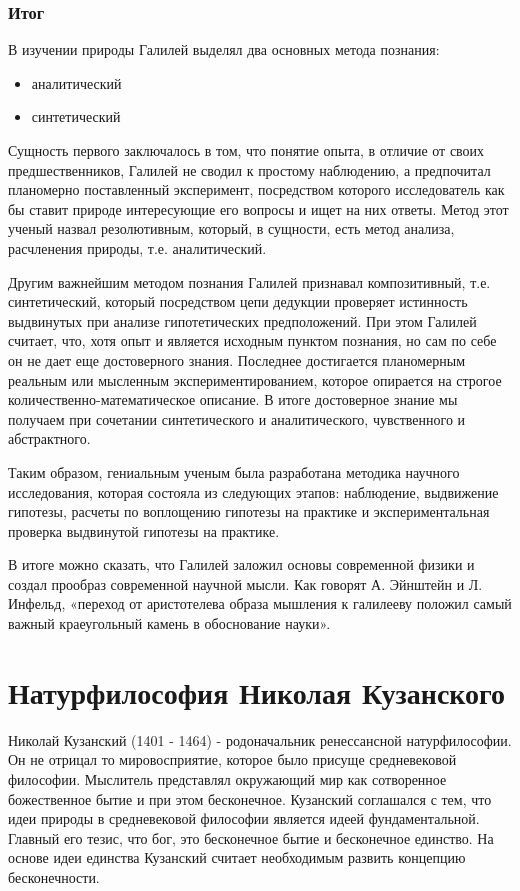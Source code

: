 \documentclass[a4paper, 14pt]{extreport}
\begin{document}
\subsubsection{Итог}

В изучении природы Галилей выделял два основных метода познания:

\begin{itemize}

\item
  аналитический
\item
  синтетический
\end{itemize}

Сущность первого заключалось в том, что понятие опыта, в отличие от
своих предшественников, Галилей не сводил к простому наблюдению, а
предпочитал планомерно поставленный эксперимент, посредством которого
исследователь как бы ставит природе интересующие его вопросы и ищет на
них ответы. Метод этот ученый назвал резолютивным, который, в сущности,
есть метод анализа, расчленения природы, т.е. аналитический.

Другим важнейшим методом познания Галилей признавал композитивный, т.е.
синтетический, который посредством цепи дедукции проверяет истинность
выдвинутых при анализе гипотетических предположений. При этом Галилей
считает, что, хотя опыт и является исходным пунктом познания, но сам по
себе он не дает еще достоверного знания. Последнее достигается
планомерным реальным или мысленным экспериментированием, которое
опирается на строгое количественно-математическое описание. В итоге
достоверное знание мы получаем при сочетании синтетического и
аналитического, чувственного и абстрактного.

Таким образом, гениальным ученым была разработана методика научного
исследования, которая состояла из следующих этапов: наблюдение,
выдвижение гипотезы, расчеты по воплощению гипотезы на практике и
экспериментальная проверка выдвинутой гипотезы на практике.

В итоге можно сказать, что Галилей заложил основы современной физики и
создал прообраз современной научной мысли. Как говорят А. Эйнштейн и Л.
Инфельд, «переход от аристотелева образа мышления к галилееву положил
самый важный краеугольный камень в обоснование науки».

\section{Натурфилософия Николая Кузанского}

Николай Кузанский (1401 - 1464) - родоначальник ренессансной
натурфилософии. Он не отрицал то мировосприятие, которое было присуще
средневековой философии. Мыслитель представлял окружающий мир как
сотворенное божественное бытие и при этом бесконечное. Кузанский
соглашался с тем, что идеи природы в средневековой философии является
идеей фундаментальной. Главный его тезис, что бог, это бесконечное бытие
и бесконечное единство. На основе идеи единства Кузанский считает
необходимым развить концепцию бесконечности.
\end{document}
